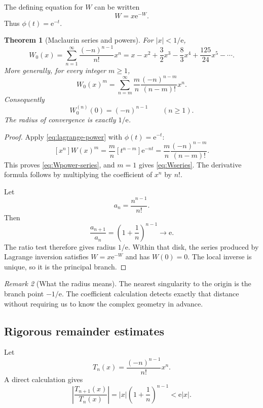 \documentclass[11pt]{article}
\newtheorem{theorem}{Theorem}[section]
\theoremstyle{remark}
\newtheorem{remark}[theorem]{Remark}
\newcommand{\Wz}{W_0}
\newcommand{\ee}{\mathrm e}
\newcommand{\abs}[1]{\left|#1\right|}
\begin{document}
The defining equation for \(W\) can be written
\[
       W=x\ee^{-W}.
\]
Thus \(\phi(t)=\ee^{-t}\).

\begin{theorem}[Maclaurin series and powers]\label{thm:maclaurin}
For \(\abs{x}<1/\ee\),
\begin{equation}\label{eq:Wseries}
 \boxed{\displaystyle
 \Wz(x)=\sum_{n=1}^{\infty}
       \frac{(-n)^{n-1}}{n!}x^n}
 =x-x^2+\frac32x^3-\frac83x^4
  +\frac{125}{24}x^5-\cdots.
\end{equation}
More generally, for every integer \(m\geq1\),
\begin{equation}\label{eq:Wpower-series}
 \Wz(x)^m
 =\sum_{n=m}^{\infty}
   \frac{m}{n}\frac{(-n)^{n-m}}{(n-m)!}x^n.
\end{equation}
Consequently
\begin{equation}\label{eq:derivatives-zero}
       \Wz^{(n)}(0)=(-n)^{n-1}\qquad(n\geq1).
\end{equation}
The radius of convergence is exactly \(1/\ee\).
\end{theorem}

\begin{proof}
Apply \eqref{eq:lagrange-power} with
\(\phi(t)=\ee^{-t}\):
\[
 [x^n]W(x)^m
 =\frac{m}{n}[t^{n-m}]\ee^{-nt}
 =\frac{m}{n}\frac{(-n)^{n-m}}{(n-m)!}.
\]
This proves \eqref{eq:Wpower-series}, and \(m=1\) gives
\eqref{eq:Wseries}.  The derivative formula follows by multiplying the
coefficient of \(x^n\) by \(n!\).

Let
\[
       a_n=\frac{n^{n-1}}{n!}.
\]
Then
\[
 \frac{a_{n+1}}{a_n}
 =\left(1+\frac1n\right)^{n-1}\longrightarrow\ee.
\]
The ratio test therefore gives radius \(1/\ee\).  Within that disk, the
series produced by Lagrange inversion satisfies \(W=x\ee^{-W}\) and has
\(W(0)=0\).  The local inverse is unique, so it is the principal branch.
\end{proof}

\begin{remark}[What the radius means]
The nearest singularity to the origin is the branch point \(-1/\ee\).
The coefficient calculation detects exactly that distance without requiring
us to know the complex geometry in advance.
\end{remark}

\subsection{Rigorous remainder estimates}

Let
\[
 T_n(x)=\frac{(-n)^{n-1}}{n!}x^n.
\]
A direct calculation gives
\begin{equation}\label{eq:termratio}
 \abs{\frac{T_{n+1}(x)}{T_n(x)}}
 =\abs{x}\left(1+\frac1n\right)^{n-1}
 <\ee\abs{x}.
\end{equation}
\end{document}
